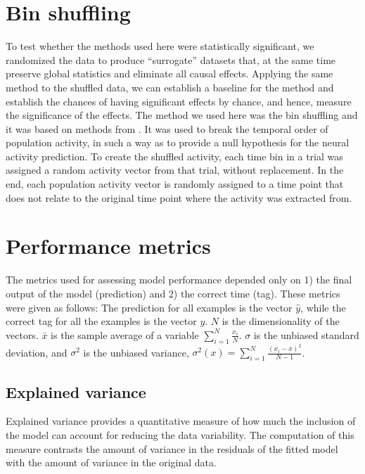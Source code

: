     
    
\section{Bin shuffling}
    
    To test whether the methods used here were statistically significant, we randomized the data to produce ``surrogate'' datasets that, at the same time preserve global statistics and eliminate all causal effects. Applying the same method to the shuffled data, we can establish a baseline for the method and establish the chances of having significant effects by chance, and hence, measure the significance of the effects. The method we used here was the 
    bin shuffling and it was based on methods from \citeauthor{bakhurin2017differential} \cite{bakhurin2017differential}. It was used to break the temporal order of population activity, in such a way as to provide a null hypothesis for the neural activity prediction. To create the shuffled activity, each time bin in a trial was assigned a random activity vector from that trial, without replacement. In the end, each population activity vector is randomly assigned to a time point that does not relate to the original time point where the activity was extracted from.

\section{Performance metrics}
\label{sec:metrics}
    The metrics used for assessing model performance depended only on 1) the final output of the model (prediction) and 2) the correct time (tag). These metrics were given as follows:
    The prediction for all examples is the vector $\hat{y}$, while the correct tag for all the examples is the vector $y$. $N$ is the dimensionality of the vectors. $\bar{x}$ is the sample average of a variable $\sum_{i=1}^N{\frac{x_i}{N}}$. $\sigma$ is the unbiased standard deviation, and $\sigma^2$ is the unbiased variance, $\sigma^2(x) = \sum_{i=1}^N{\frac{(x_i - \bar x)^2}{N - 1}}$.

    \subsection{Explained variance}
        Explained variance provides a quantitative measure of how much the inclusion of the model can account for reducing the data variability. The computation of this measure contrasts the amount of variance in the residuals of the fitted model with the amount of variance in the original data.

